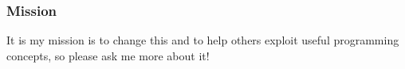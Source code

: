 \begin{frame}
\frametitle{Mission}
\begin{center}
It is my mission is to change this and to help others exploit useful programming concepts, so please ask me more about it!
\end{center}
\end{frame}
